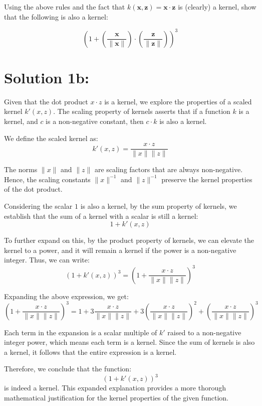 \documentclass[10pt]{article}
\begin{document}
Using the above rules and the fact that $k(\boldsymbol{x}, \boldsymbol{z})=\boldsymbol{x} \cdot \boldsymbol{z}$ is (clearly) a kernel, show that the following is also a kernel:

$$
\left(1+\left(\frac{\boldsymbol{x}}{\|\boldsymbol{x}\|}\right) \cdot\left(\frac{\boldsymbol{z}}{\|\boldsymbol{z}\|}\right)\right)^{3}
$$

\section*{Solution 1b:}

Given that the dot product \( x \cdot z \) is a kernel, we explore the properties of a scaled kernel \( k'(x, z) \). The scaling property of kernels asserts that if a function \( k \) is a kernel, and \( c \) is a non-negative constant, then \( c \cdot k \) is also a kernel. 

We define the scaled kernel as:
\[ k'(x, z) = \frac{x \cdot z}{\|x\|\|z\|} \]

The norms \( \|x\| \) and \( \|z\| \) are scaling factors that are always non-negative. Hence, the scaling constants \( \|x\|^{-1} \) and \( \|z\|^{-1} \) preserve the kernel properties of the dot product.

Considering the scalar \( 1 \) is also a kernel, by the sum property of kernels, we establish that the sum of a kernel with a scalar is still a kernel:
\[ 1 + k'(x, z) \]

To further expand on this, by the product property of kernels, we can elevate the kernel to a power, and it will remain a kernel if the power is a non-negative integer. Thus, we can write:
\[ \left( 1 + k'(x, z) \right)^3 = \left( 1 + \frac{x \cdot z}{\|x\|\|z\|} \right)^3 \]

Expanding the above expression, we get:
\[ \left( 1 + \frac{x \cdot z}{\|x\|\|z\|} \right)^3 = 1 + 3\frac{x \cdot z}{\|x\|\|z\|} + 3\left(\frac{x \cdot z}{\|x\|\|z\|}\right)^2 + \left(\frac{x \cdot z}{\|x\|\|z\|}\right)^3 \]

Each term in the expansion is a scalar multiple of \( k' \) raised to a non-negative integer power, which means each term is a kernel. Since the sum of kernels is also a kernel, it follows that the entire expression is a kernel.

Therefore, we conclude that the function:
\[ \left( 1 + k'(x, z) \right)^3 \]
is indeed a kernel. This expanded explanation provides a more thorough mathematical justification for the kernel properties of the given function. \\
\end{document}
